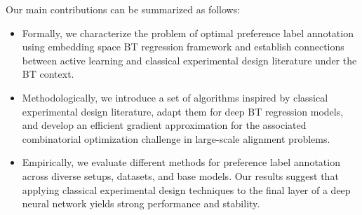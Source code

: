 Our main contributions can be summarized as follows:
\begin{itemize}[nosep, leftmargin=*]
    \item Formally, we characterize the problem of optimal preference label annotation using embedding space BT regression framework and establish connections between active learning and classical experimental design literature under the BT context.
    \item Methodologically, we introduce a set of algorithms inspired by classical experimental design literature, adapt them for deep BT regression models, and develop an efficient gradient approximation for the associated combinatorial optimization challenge in large-scale alignment problems.
    \item Empirically, we evaluate different methods for preference label annotation across diverse setups, datasets, and base models. Our results suggest that applying classical experimental design techniques to the final layer of a deep neural network yields strong performance and stability.
\end{itemize}



